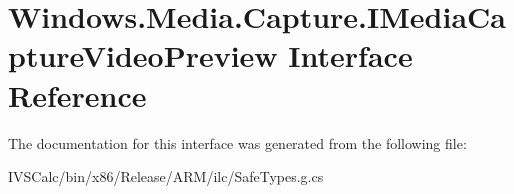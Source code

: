 \hypertarget{interface_windows_1_1_media_1_1_capture_1_1_i_media_capture_video_preview}{}\section{Windows.\+Media.\+Capture.\+I\+Media\+Capture\+Video\+Preview Interface Reference}
\label{interface_windows_1_1_media_1_1_capture_1_1_i_media_capture_video_preview}


The documentation for this interface was generated from the following file\+:\begin{DoxyCompactItemize}
\item 
I\+V\+S\+Calc/bin/x86/\+Release/\+A\+R\+M/ilc/Safe\+Types.\+g.\+cs\end{DoxyCompactItemize}
